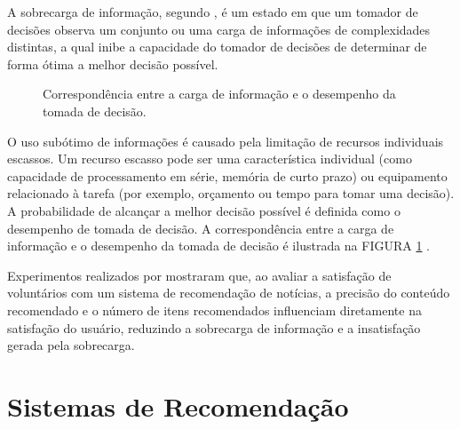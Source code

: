 A sobrecarga de informação, segundo \citet{roetzel2019information}, é um estado em que um tomador de decisões observa um
conjunto ou uma carga de informações de complexidades distintas, a qual inibe a
capacidade do tomador de decisões de determinar de forma ótima a melhor decisão
possível.

\vspace{0.2cm}
\begin{figure}[h]
    \caption{Correspondência entre a carga de informação e o desempenho da tomada
    de decisão.}
    \label{fig:u_invertida}
\end{figure}
\vspace{0.2cm}

O uso subótimo de informações é causado
pela limitação de recursos individuais escassos. Um recurso escasso pode ser uma
característica individual (como capacidade de processamento em série, memória de
curto prazo) ou equipamento relacionado à tarefa (por exemplo, orçamento ou
tempo para tomar uma decisão). A probabilidade de alcançar a melhor decisão
possível é definida como o desempenho de tomada de decisão. A correspondência
entre a carga de informação e o desempenho da tomada de decisão é ilustrada na
FIGURA \ref{fig:u_invertida} \cite{roetzel2019information}.

Experimentos realizados por \citet{liang2006personalized} mostraram que, ao
avaliar a satisfação de voluntários com um sistema de recomendação de notícias,
a precisão do conteúdo recomendado e o número de itens
recomendados influenciam diretamente na satisfação do usuário, reduzindo a
sobrecarga de informação e a insatisfação gerada pela sobrecarga.

\section{Sistemas de Recomendação}

